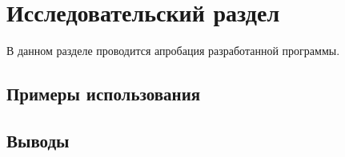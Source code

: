 \chapter{Исследовательский раздел}
\label{cha:research}

В данном разделе проводится апробация разработанной программы.



\section{Примеры использования}

\section{Выводы}



